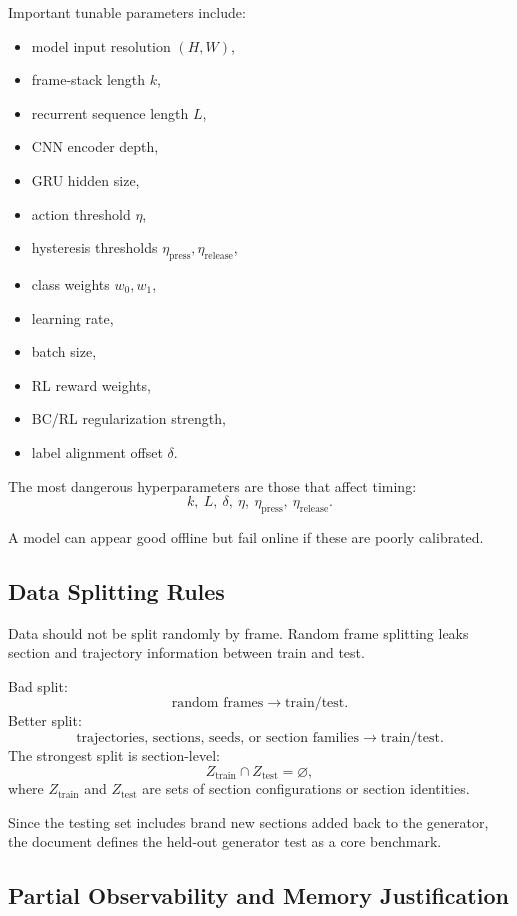 \documentclass[11pt]{article}
\begin{document}
Important tunable parameters include:
\begin{itemize}
  \item model input resolution \((H,W)\),
  \item frame-stack length \(k\),
  \item recurrent sequence length \(L\),
  \item CNN encoder depth,
  \item GRU hidden size,
  \item action threshold \(\eta\),
  \item hysteresis thresholds \(\eta_{\mathrm{press}}, \eta_{\mathrm{release}}\),
  \item class weights \(w_0,w_1\),
  \item learning rate,
  \item batch size,
  \item RL reward weights,
  \item BC/RL regularization strength,
  \item label alignment offset \(\delta\).
\end{itemize}

The most dangerous hyperparameters are those that affect timing:
\[
  k,\ L,\ \delta,\ \eta,\ \eta_{\mathrm{press}},\ \eta_{\mathrm{release}}.
\]

A model can appear good offline but fail online if these are poorly calibrated.

\subsection{Data Splitting Rules}

Data should not be split randomly by frame. Random frame splitting leaks section and trajectory information between train and test.

Bad split:
\[
  \text{random frames} \rightarrow \text{train/test}.
\]
Better split:
\[
  \text{trajectories, sections, seeds, or section families} \rightarrow \text{train/test}.
\]
The strongest split is section-level:
\[
  Z_{\mathrm{train}} \cap Z_{\mathrm{test}} = \varnothing,
\]
where \(Z_{\mathrm{train}}\) and \(Z_{\mathrm{test}}\) are sets of section configurations or section identities.

Since the testing set includes brand new sections added back to the generator, the document defines the held-out generator test as a core benchmark.

\subsection{Partial Observability and Memory Justification}
\end{document}
